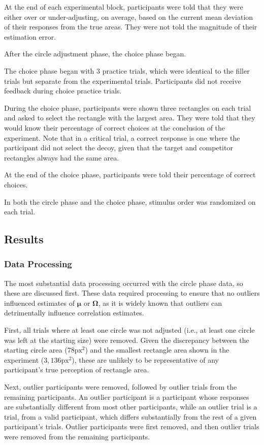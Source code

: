 At the end of each experimental block, participants were told that they were either over or under-adjusting, on average, based on the current mean deviation of their responses from the true areas. They were not told the magnitude of their estimation error.

After the circle adjustment phase, the choice phase began. 

The choice phase began with $3$ practice trials, which were identical to the filler trials but separate from the experimental trials. Participants did not receive feedback during choice practice trials. 

During the choice phase, participants were shown three rectangles on each trial and asked to select the rectangle with the largest area. They were told that they would know their percentage of correct choices at the conclusion of the experiment. Note that in a critical trial, a correct response is one where the participant did not select the decoy, given that the target and competitor rectangles always had the same area.

At the end of the choice phase, participants were told their percentage of correct choices. 

In both the circle phase and the choice phase, stimulus order was randomized on each trial.

\subsection{Results}
\subsubsection{Data Processing}

The most substantial data processing occurred with the circle phase data, so these are discussed first. These data required processing to ensure that no outliers influenced estimates of $\boldsymbol{\mu}$ or $\mathbf{\Omega}$, as it is widely known that outliers can detrimentally influence correlation estimates. 

First, all trials where at least one circle was not adjusted (i.e.,
at least one circle was left at the starting size) were removed. Given the discrepancy between the starting circle area ($78\text{px}^2$) and the smallest rectangle area shown in the experiment ($3,136\text{px}^2$), these are unlikely to be representative of any participant's true perception of rectangle area.

Next, outlier participants were removed, followed by outlier trials from the remaining participants. An outlier participant is a participant whose responses are substantially different from most other participants, while an outlier trial is a trial, from a valid participant, which differs substantially from the rest of a given participant's trials. Outlier participants were first removed, and then outlier trials were removed from the remaining participants.

